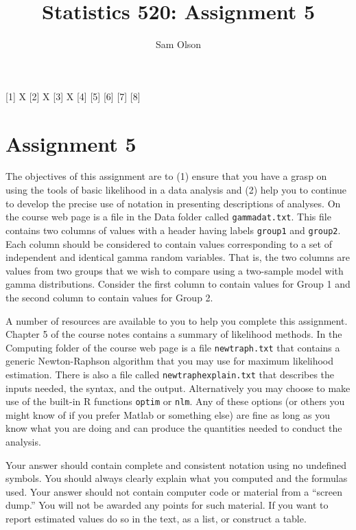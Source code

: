 \documentclass[
]{article}
\title{Statistics 520: Assignment 5}
\author{Sam Olson}
\date{}
\begin{document}
\maketitle

{[}1{]} X {[}2{]} X {[}3{]} X {[}4{]} {[}5{]} {[}6{]} {[}7{]} {[}8{]}

\section{Assignment 5}\label{assignment-5}

The objectives of this assignment are to (1) ensure that you have a
grasp on using the tools of basic likelihood in a data analysis and (2)
help you to continue to develop the precise use of notation in
presenting descriptions of analyses. On the course web page is a file in
the Data folder called \texttt{gammadat.txt}. This file contains two
columns of values with a header having labels \texttt{group1} and
\texttt{group2}. Each column should be considered to contain values
corresponding to a set of independent and identical gamma random
variables. That is, the two columns are values from two groups that we
wish to compare using a two-sample model with gamma distributions.
Consider the first column to contain values for Group 1 and the second
column to contain values for Group 2.

A number of resources are available to you to help you complete this
assignment. Chapter 5 of the course notes contains a summary of
likelihood methods. In the Computing folder of the course web page is a
file \texttt{newtraph.txt} that contains a generic Newton-Raphson
algorithm that you may use for maximum likelihood estimation. There is
also a file called \texttt{newtraphexplain.txt} that describes the
inputs needed, the syntax, and the output. Alternatively you may choose
to make use of the built-in R functions \texttt{optim} or \texttt{nlm}.
Any of these options (or others you might know of if you prefer Matlab
or something else) are fine as long as you know what you are doing and
can produce the quantities needed to conduct the analysis.

Your answer should contain complete and consistent notation using no
undefined symbols. You should always clearly explain what you computed
and the formulas used. Your answer should not contain computer code or
material from a ``screen dump.'' You will not be awarded any points for
such material. If you want to report estimated values do so in the text,
as a list, or construct a table.
\end{document}
